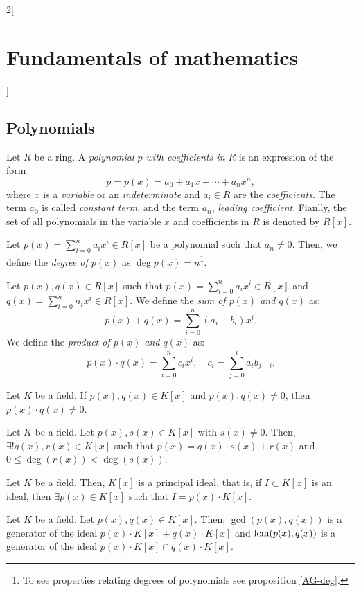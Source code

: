 \documentclass[../../../main.tex]{subfiles}
\begin{document}
\begin{multicols}{2}[\section{Fundamentals of mathematics}]
    \subsection{Polynomials}
    \begin{definition}
        Let $R$ be a ring. A \textit{polynomial $p$ with coefficients in $R$} is an expression of the form $$p=p(x)=a_0+a_1x+\cdots+a_nx^n,$$ where $x$ is a \textit{variable} or an \textit{indeterminate} and $a_i\in R$ are the \textit{coefficients}. The term $a_0$ is called \textit{constant term}, and the term $a_n$, \textit{leading coefficient}. Fianlly, the set of all polynomials in the variable $x$ and coefficients in $R$ is denoted by $R[x]$.
    \end{definition}
    \begin{definition}
        Let $p(x)=\sum_{i=0}^na_ix^i\in R[x]$ be a polynomial such that $a_n\ne 0$. Then, we define the \textit{degree of $p(x)$} as $\deg p(x)=n$\footnote{To see properties relating degrees of polynomials see proposition \ref{AG-deg}.}.
    \end{definition}
    \begin{definition}
        Let $p(x),q(x)\in R[x]$ such that $p(x)=\sum_{i=0}^na_ix^i\in R[x]$ and $q(x)=\sum_{i=0}^nn_ix^i\in R[x]$. We define the \textit{sum of $p(x)$ and $q(x)$} as: $$p(x)+q(x)=\sum_{i=0}^n(a_i+b_i)x^i.$$
        We define the \textit{product of $p(x)$ and $q(x)$} as: $$p(x)\cdot q(x)=\sum_{i=0}^nc_ix^i,\quad c_i=\sum_{j=0}^ia_ib_{j-i}.$$
    \end{definition}
    \begin{prop}
        Let $K$ be a field. If $p(x),q(x)\in K[x]$ and $p(x),q(x)\ne 0$, then $p(x)\cdot q(x)\ne 0$.
    \end{prop}
    \begin{theorem}
        Let $K$ be a field. Let $p(x),s(x)\in K[x]$ with $s(x)\ne 0$. Then, $\exists! q(x),r(x)\in K[x]$ such that $p(x)=q(x)\cdot s(x)+r(x)$ and $0\leq\deg(r(x))<\deg(s(x))$.
    \end{theorem}
    \begin{theorem}
        Let $K$ be a field. Then, $K[x]$ is a principal ideal, that is, if $I\subset K[x]$ is an ideal, then $\exists p(x)\in K[x]$ such that $I=p(x)\cdot K[x]$.
    \end{theorem}
    \begin{definition}
        Let $K$ be a field. Let $p(x),q(x)\in K[x]$. Then, $\gcd(p(x),q(x))$ is a generator of the ideal $p(x)\cdot K[x]+q(x)\cdot K[x]$ and $\operatorname{lcm}(p(x),q(x))$ is a generator of the ideal $p(x)\cdot K[x]\cap q(x)\cdot K[x]$.

\end{definition}
\end{multicols}
\end{document}
